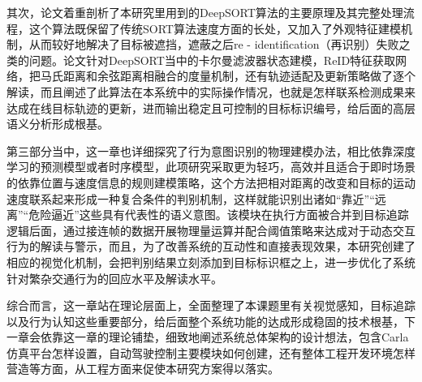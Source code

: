 其次，论文着重剖析了本研究里用到的DeepSORT算法的主要原理及其完整处理流程，这个算法既保留了传统SORT算法速度方面的长处，又加入了外观特征建模机制，从而较好地解决了目标被遮挡，遮蔽之后re - identification（再识别）失败之类的问题。论文针对DeepSORT当中的卡尔曼滤波器状态建模，ReID特征获取网络，把马氏距离和余弦距离相融合的度量机制，还有轨迹适配及更新策略做了逐个解读，而且阐述了此算法在本系统中的实际操作情况，也就是怎样联系检测成果来达成在线目标轨迹的更新，进而输出稳定且可控制的目标标识编号，给后面的高层语义分析形成根基。

第三部分当中，这一章也详细探究了行为意图识别的物理建模办法，相比依靠深度学习的预测模型或者时序模型，此项研究采取更为轻巧，高效并且适合于即时场景的依靠位置与速度信息的规则建模策略，这个方法把相对距离的改变和目标的运动速度联系起来形成一种复合条件的判别机制，这样就能识别出诸如“靠近”“远离”“危险逼近”这些具有代表性的语义意图。该模块在执行方面被合并到目标追踪逻辑后面，通过接连帧的数据开展物理量运算并配合阈值策略来达成对于动态交互行为的解读与警示，而且，为了改善系统的互动性和直接表现效果，本研究创建了相应的视觉化机制，会把判别结果立刻添加到目标标识框之上，进一步优化了系统针对繁杂交通行为的回应水平及解读水平。

综合而言，这一章站在理论层面上，全面整理了本课题里有关视觉感知，目标追踪以及行为认知这些重要部分，给后面整个系统功能的达成形成稳固的技术根基，下一章会依靠这一章的理论铺垫，细致地阐述系统总体架构的设计想法，包含Carla仿真平台怎样设置，自动驾驶控制主要模块如何创建，还有整体工程开发环境怎样营造等方面，从工程方面来促使本研究方案得以落实。


\begin{tabular}{l l}
\end{tabular}
